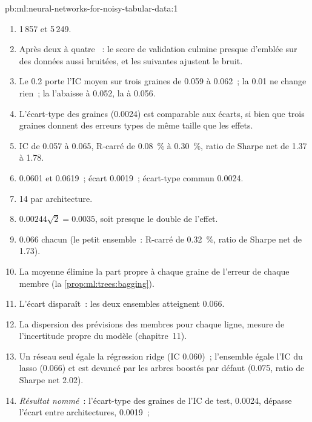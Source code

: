 \begin{solution}{pb:ml:neural-networks-for-noisy-tabular-data:1}
\begin{enumerate}
\item 1\,857 et 5\,249.
\item Après deux à quatre ~: le score de validation culmine presque d'emblée sur des données aussi bruitées, et les  suivantes ajustent le bruit.
\item Le  0.2 porte l'IC moyen sur trois graines de 0.059 à 0.062~; la  0.01 ne change rien~; la  l'abaisse à 0.052, la  à 0.056.
\item L'écart-type des graines (0.0024) est comparable aux écarts, si bien que trois graines donnent des erreurs types
de même taille que les effets.
\item IC de 0.057 à 0.065, R-carré de 0.08~\% à 0.30~\%, ratio de Sharpe net de 1.37 à 1.78.
\item 0.0601 et 0.0619~; écart 0.0019~; écart-type commun 0.0024.
\item 14 par architecture.
\item $0.00244\sqrt2 = 0.0035$, soit presque le double de l'effet.
\item 0.066 chacun (le petit ensemble~: R-carré de 0.32~\%, ratio de Sharpe net de 1.73).
\item La moyenne élimine la part propre à chaque graine de l'erreur de chaque membre (la \cref{prop:ml:trees:bagging}).
\item L'écart disparaît~: les deux ensembles atteignent 0.066.
\item La dispersion des prévisions des membres pour chaque ligne, mesure de l'incertitude propre du modèle (chapitre~11).
\item Un réseau seul égale la régression ridge (IC 0.060)~; l'ensemble égale l'IC du lasso (0.066) et est devancé par les arbres boostés
par défaut (0.075, ratio de Sharpe net 2.02).
\item \emph{Résultat nommé}~: l'écart-type des graines de l'IC de test, 0.0024, dépasse l'écart entre architectures, 0.0019~;

\end{enumerate}
\end{solution}
